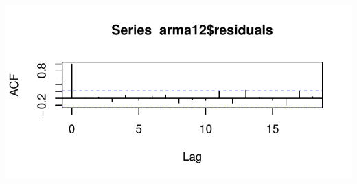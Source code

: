 \documentclass[10pt,a4paper,noindentfirst]{article}\usepackage[]{graphicx}\usepackage[]{color}
\makeatletter
\def\maxwidth{ %
  \ifdim\Gin@nat@width>\linewidth
    \linewidth
  \else
    \Gin@nat@width
  \fi
}
\newenvironment{knitrout}{}{} %
\makeatother
\begin{document}
\begin{knitrout}
{\centering \includegraphics[width=\maxwidth]{figure/unnamed-chunk-411} 

}



\end{knitrout}
\end{document}
